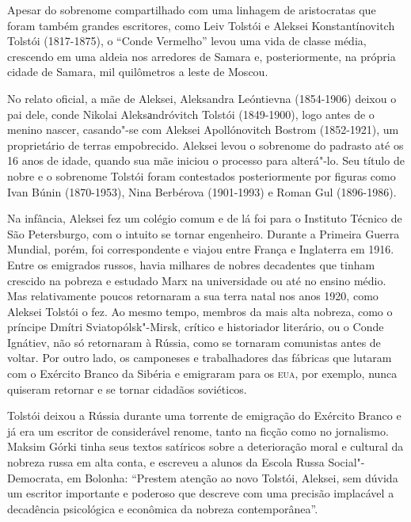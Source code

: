 \documentclass[11pt]{extarticle}
\begin{document}

Apesar do sobrenome compartilhado com uma linhagem de aristocratas que
foram também grandes escritores, como Leiv Tolstói e Aleksei
Konstantínovitch Tolstói (1817-1875), o ``Conde Vermelho'' levou uma
vida de classe média, crescendo em uma aldeia nos arredores de Samara e,
posteriormente, na própria cidade de Samara, mil quilômetros a leste de
Moscou.

No relato oficial, a mãe de Aleksei, Aleksandra Leóntievna (1854-1906)
deixou o pai dele, conde Nikolai Aleksаndróvitch Tolstói (1849-1900),
logo antes de o menino nascer, casando"-se com Aleksei Apollónovitch
Bostrom (1852-1921), um proprietário de terras empobrecido. Aleksei
levou o sobrenome do padrasto até os 16 anos de idade, quando sua mãe
iniciou o processo para alterá"-lo. Seu título de nobre e o sobrenome
Tolstói foram contestados posteriormente por figuras como Ivan Búnin
(1870-1953), Nina Berbérova (1901-1993) e Roman Gul (1896-1986).

Na infância, Aleksei fez um
colégio comum e de lá foi para o Instituto Técnico de São Petersburgo,
com o intuito se tornar engenheiro. Durante a Primeira Guerra Mundial,
porém, foi correspondente e viajou entre França e Inglaterra em
1916. Entre os emigrados russos,
havia milhares de nobres decadentes que tinham crescido na pobreza e
estudado Marx na universidade ou até no ensino médio. Mas relativamente
poucos retornaram a sua terra natal nos anos 1920, como Aleksei Tolstói
o fez. Ao mesmo tempo, membros da mais alta nobreza, como o príncipe
Dmítri Sviatopólsk"-Mirsk, crítico e historiador literário, ou o Conde
Ignátiev, não só retornaram à Rússia, como se tornaram comunistas antes
de voltar. Por outro lado, os camponeses e trabalhadores das fábricas
que lutaram com o Exército Branco da Sibéria e emigraram para os \textsc{eua},
por exemplo, nunca quiseram retornar e se tornar cidadãos soviéticos.

Tolstói deixou a Rússia durante uma torrente de emigração do Exército
Branco e já era um escritor de considerável renome, tanto na ficção como
no jornalismo. Maksim Górki tinha seus textos satíricos sobre a
deterioração moral e cultural da nobreza russa em alta conta, e escreveu
a alunos da Escola Russa Social"-Democrata, em Bolonha: ``Prestem atenção
ao novo Tolstói, Aleksei, sem dúvida um escritor importante e poderoso
que descreve com uma precisão implacável a decadência psicológica e
econômica da nobreza contemporânea''. 
\end{document}
